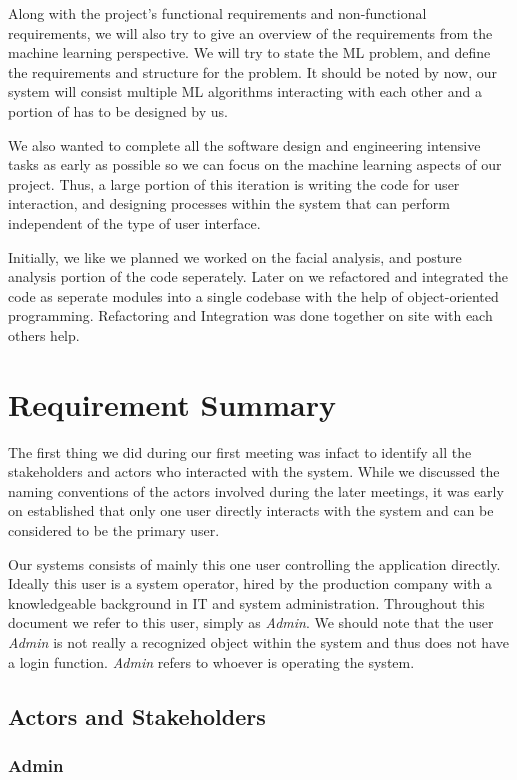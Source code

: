\documentclass[12pt,a4paper,man]{report}
\begin{document}
Along with the project's functional requirements and non-functional requirements, we will also try to give an overview of the requirements from the machine learning perspective. We will try to state the ML problem, and define the requirements and structure for the problem. It should be noted by now, our system will consist multiple ML algorithms interacting with each other and a portion of has to be designed by us. 

We also wanted to complete all the software design and engineering intensive tasks as early as possible so we can focus on the machine learning aspects of our project. Thus, a large portion of this iteration is writing the code for user interaction, and designing processes within the system that can perform independent of the type of user interface.

Initially, we like we planned we worked on the facial analysis, and posture analysis portion of the code seperately. Later on we refactored and integrated the code as seperate modules into a single codebase with the help of object-oriented programming. Refactoring and Integration was done together on site with each others help.


\chapter{Requirement Summary}
\label{sec:org2f6e116}
The first thing we did during our first meeting was infact to identify all the stakeholders and actors who interacted with the system. While we discussed the naming conventions of the actors involved during the later meetings, it was early on established that only one user directly interacts with the system and can be considered to be the primary user.

Our systems consists of mainly this one user controlling the application directly. Ideally this user is a system operator, hired by the production company with a knowledgeable background in IT and system administration. Throughout this document we refer to this user, simply as \emph{Admin}. We should note that the user \emph{Admin} is not really a recognized object within the system and thus does not have a login function. \emph{Admin} refers to whoever is operating the system.

\section{Actors and Stakeholders}
\label{sec:org4e49b26}
\subsection{Admin}
\label{sec:org4e0a5f0}
\end{document}
